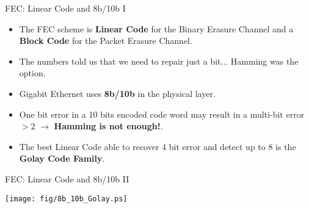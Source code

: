 \documentclass[compress,red]{beamer}
\begin{document}
\begin{frame}{FEC: Linear Code and 8b/10b I}

  \begin{itemize}
    \item The FEC scheme is \textbf{Linear Code} for the Binary Erasure
    Channel and a \textbf{Block Code} for the Packet Erasure Channel. 
    \item The numbers told us that we need to repair just a bit... Hamming was the option.
    \item Gigabit Ethernet uses \textbf{8b/10b} in the physical layer. 
    \item One bit error in a 10 bits encoded code word may result in a multi-bit
    error $>2$ $\rightarrow$
    \textbf{Hamming is not enough!}.
    \item The best Linear Code able to recover 4 bit error and detect up to 8 is
    the \textbf{Golay Code Family}.
  \end{itemize}
\end{frame}

\begin{frame}{FEC: Linear Code and 8b/10b II}
 
 \begin{center}
 \texttt{[image: fig/8b\_10b\_Golay.ps]}
 \end{center}

\end{frame}
\end{document}
